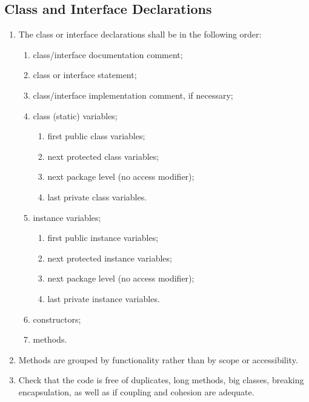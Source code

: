 \documentclass[a4paper,11pt]{report} %
\begin{document}
		\subsection*{Class and Interface Declarations}\begin{enumerate}[resume]
			\item The class or interface declarations shall be in the following order:
			\begin{enumerate}
				\item class/interface documentation comment;
				\item class or interface statement;
				\item class/interface implementation comment, if necessary;
				\item class (static) variables;
				\begin{enumerate}
					\item first public class variables;
					\item next protected class variables;
					\item next package level (no access modifier);
					\item last private class variables.
				\end{enumerate}
				\item instance variables;
				\begin{enumerate}
					\item first public instance variables;
					\item next protected instance variables;
					\item next package level (no access modifier);
					\item last private instance variables.
				\end{enumerate}
				\item constructors;
				\item methods.
			\end{enumerate}
			\item Methods are grouped by functionality rather than by scope or accessibility.
			\item Check that the code is free of duplicates, long methods, big classes, breaking encapsulation, as well as if coupling and cohesion are adequate.
		\end{enumerate}
		
\end{document}
